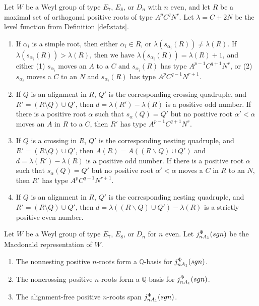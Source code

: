 \documentclass[10pt,a4paper]{amsart}
\newcommand{\Q}{{\mathbb Q}}
\newcommand{\al}{\alpha}
\newcommand{\macd}[2]{j^{#1}_{#2}({\rm{sgn}})}
\begin{document}
\begin{prop}\label{prop:miracle}
Let $W$ be a Weyl group of type $E_7$, $E_8$, or $D_{n}$ with $n$ even, and let
$R$ be a maximal set of  orthogonal positive roots of type $A^p C^q N^r$. Let
$\lambda=C+2N$ be the level function from Definition \ref{def:stats}.
\begin{enumerate}
    \item[{\rm (i)}]{If $\al_i$ is a simple root, then either $\al_i \in R$, or
         $\lambda(s_{\al_i}(R)) \ne \lambda(R)$.  If $\lambda(s_{\al_i}(R)) >
         \lambda(R)$, then we have $\lambda(s_{\al_i}(R)) = \lambda(R) + 1$, and
         either (1) $s_{\al_i}$ moves an $A$ to a $C$ and $s_{\al_i}(R)$ has
         type $A^{p-1}C^{q+1}N^r$, or (2) $s_{\al_i}$ moves a $C$ to an $N$ and
     $s_{\al_i}(R)$ has type $A^pC^{q-1}N^{r+1}$.}
 \item[{\rm (ii)}]If $Q$ is an alignment in $R$, $Q'$ is the corresponding
     crossing quadruple, and $R'=(R\setminus Q)\cup Q'$,  then $d = \lambda(R')
     - \lambda(R)$ is a positive odd number.  If there is a positive root $\al$
     such that $s_\alpha(Q)=Q'$ but no positive root $\al'<\al$ moves an $A$ in
     $R$ to
     a $C$, then $R'$ has type $A^{p-1}C^{q+1}N^{r}$.
 \item[{\rm (iii)}]If $Q$ is a crossing in $R$, $Q'$ is the corresponding
      nesting quadruple, and $R'=(R\setminus Q)\cup Q'$, then $A(R) = A((R
      \backslash Q) \cup Q')$ and $d = \lambda(R') - \lambda(R)$ is a positive
      odd number.  If there is a positive root $\al$ such that $s_\alpha(Q)=Q'$
      but no positive root $\al'<\al$ moves a $C$ in $R$ to an $N$, then $R'$
      has type $A^{p}C^{q-1}N^{r+1}$.
  \item[{\rm (iv)}] If $Q$ is an alignment in $R$, $Q'$ is the corresponding
      nesting quadruple, and $R'=(R\setminus Q)\cup Q'$, then $d = \lambda((R
      \backslash Q) \cup Q') - \lambda(R)$ is a strictly positive even number.
\end{enumerate}
\end{prop}

\begin{theorem}\label{thm:indep}
Let $W$ be a Weyl group of type $E_7$, $E_8$, or $D_n$ for $n$ even. Let
$\macd{\Phi}{nA_1}$ be the Macdonald representation of $W$.
\begin{enumerate}
    \item[{\rm (i)}]{The nonnesting positive $n$-roots form a $\Q$-basis for
     $\macd{\Phi}{nA_1}$.}
 \item[{\rm (ii)}]{The noncrossing positive $n$-roots form a $\Q$-basis for
     $\macd{\Phi}{nA_1}$.}
 \item[{\rm (iii)}]{The alignment-free positive $n$-roots span
     $\macd{\Phi}{nA_1}$.}
\end{enumerate}
\end{theorem}
\end{document}
